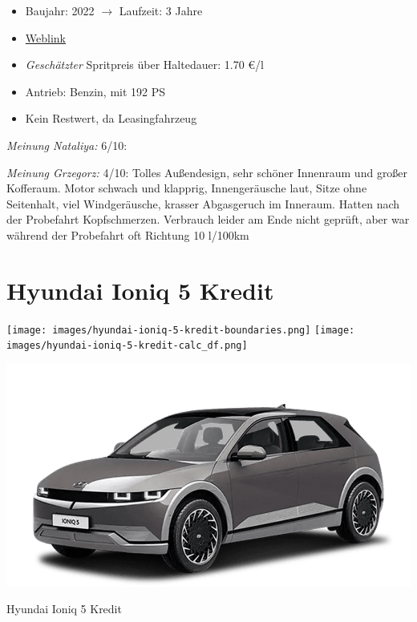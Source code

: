\documentclass[landscape, DIV=99, 14pt]{scrartcl}
\begin{document}
\begin{itemize}
    \item Baujahr: 2022 $\rightarrow$ Laufzeit: 3 Jahre
    \item \href{https://konfigurator.meinauto.de/mazda/neuwagen/48-6/angebote/6-kombi/konfigurator/\#!/extras/exclusive-line/8846370/10,11,15/private/65352-5416-204698/984/61c9aa657e74c/leasing/16040--249432/36,3000,15000,0,0,0,0,0,}{Weblink}
    \item \emph{Gesch\"atzter} Spritpreis \"uber Haltedauer: 1.70 \euro{}/l
    \item Antrieb: Benzin, mit 192 PS
    \item Kein Restwert, da Leasingfahrzeug
\end{itemize}

\begin{small}
\emph{Meinung Nataliya:} 6/10: 
        
\emph{Meinung Grzegorz:} 4/10: Tolles Au\ss{}endesign, sehr sch\"oner Innenraum und gro\ss{}er Kofferaum. Motor schwach und klapprig, Innenger\"ausche laut, Sitze ohne Seitenhalt, viel Windger\"ausche, krasser Abgasgeruch im Inneraum. Hatten nach der Probefahrt Kopfschmerzen. Verbrauch leider am Ende nicht gepr\"uft, aber war w\"ahrend der Probefahrt oft Richtung 10 l/100km
\end{small}

\pagebreak


\twocolumn

\section*{Hyundai Ioniq 5 Kredit}
\begin{center}
\texttt{[image: images/hyundai-ioniq-5-kredit-boundaries.png]}
\null
\vspace{0.5cm}
\texttt{[image: images/hyundai-ioniq-5-kredit-calc\_df.png]}
\end{center}

\pagebreak
\begin{center}
\includegraphics[width=0.9\columnwidth]{cars/hyundai-ioniq-5.png}

Hyundai Ioniq 5 Kredit
\end{center}
\end{document}
